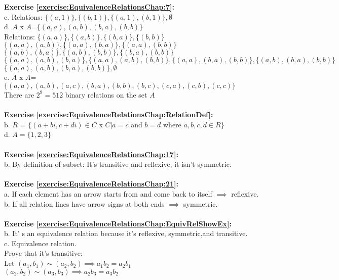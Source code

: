 \noindent\textbf{Exercise \ref{exercise:EquivalenceRelationsChap:7}:}\\
c. Relations: $\{(a,1)\},\{(b,1)\},\{(a,1),(b,1)\},\emptyset$\\
d. $A$ x $A$=$\{(a,a),(a,b),(b,a),(b,b)\}$\\
Relations: $\{(a,a)\},\{(a,b)\}, \{(b,a)\}, \{(b,b)\}$\\
$\{(a,a),(a,b)\}, \{(a,a),(b,a)\}, \{(a,a),(b,b)\}$\\
$\{(a,b),(b,a)\}, \{(a,b),(b,b)\}, \{(b,a),(b,b)\}$\\
$\{(a,a),(a,b),(b,a)\}, \{(a,a),(a,b),(b,b)\}, \{(a,a),(b,a),(b,b)\}, \{(a,b),(b,a),(b,b)\}$\\
$\{(a,a),(a,b),(b,a),(b,b)\},\emptyset$\\
e. $A$ x $A$=$\{(a,a),(a,b),(a,c),(b,a),(b,b),(b,c),(c,a),(c,b),(c,c)\}$\\
There are $2^9=512$ binary relations on the set $A$\\
\\
\textbf{Exercise \ref{exercise:EquivalenceRelationsChap:RelationDef}:}\\
b. $R$ = $\{(a+bi,c+di)\in C$ x $C | a=c$ and $b=d$ where $a,b,c,d\in R\}$\\
d. $A=\{1,2,3\}$\\
\\
\textbf{Exercise \ref{exercise:EquivalenceRelationsChap:17}:}\\
b. By definition of subset: It's transitive and reflexive; it isn't symmetric.\\
\\
\textbf{Exercise \ref{exercise:EquivalenceRelationsChap:21}:}\\
a. If each element has an arrow starts from and come back to itself $\implies$  reflexive.\\
b. If all relation lines have arrow signs at both ends $\implies$  symmetric.\\
\\
\textbf{Exercise \ref{exercise:EquivalenceRelationsChap:EquivRelShowEx}:}\\
b. It' s an equivalence relation because it's reflexive, symmetric,and transitive.\\
c. Equivalence relation.\\
Prove that it's transitive:\\
Let $(a_1,b_1)\sim (a_2,b_2) \implies a_1b_2=a_2b_1$\\
    $(a_2,b_2)\sim (a_3,b_3) \implies a_2b_3=a_3b_2$\\
